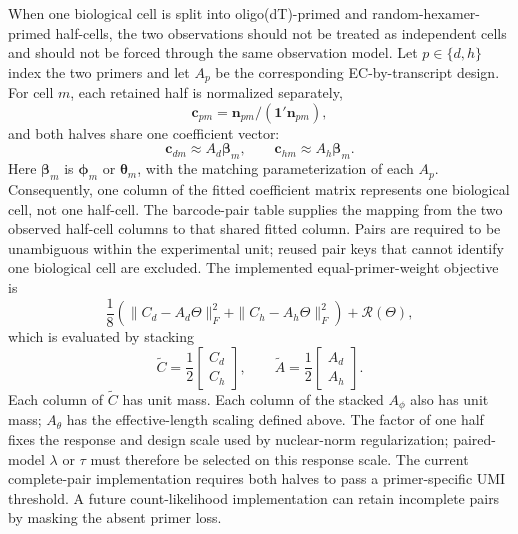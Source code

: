 \documentclass[11pt]{article}
\begin{document}
When one biological cell is split into oligo(dT)-primed and random-hexamer-
primed half-cells, the two observations should not be treated as independent
cells and should not be forced through the same observation model. Let
\(p\in\{d,h\}\) index the two primers and let \(A_p\) be the corresponding
EC-by-transcript design. For cell \(m\), each retained half is normalized
separately,
\[
  \bm c_{pm}=\bm n_{pm}/(\bm 1'\bm n_{pm}),
\]
and both halves share one coefficient vector:
\[
  \bm c_{dm}\approx A_d\bm\beta_m,
  \qquad
  \bm c_{hm}\approx A_h\bm\beta_m.
\]
Here \(\bm\beta_m\) is \(\bm\phi_m\) or \(\bm\theta_m\), with the matching
parameterization of each \(A_p\).
Consequently, one column of the fitted coefficient matrix represents one
biological cell, not one half-cell. The barcode-pair table supplies the mapping
from the two observed half-cell columns to that shared fitted column. Pairs are
required to be unambiguous within the experimental unit; reused pair keys that
cannot identify one biological cell are excluded.
The implemented equal-primer-weight objective is
\[
  \frac{1}{8}\left(
    \|C_d-A_d\Theta\|_F^2+
    \|C_h-A_h\Theta\|_F^2
  \right)+\mathcal R(\Theta),
\]
which is evaluated by stacking
\[
  \widetilde C=\frac{1}{2}\begin{bmatrix}C_d\\C_h\end{bmatrix},
  \qquad
  \widetilde A=\frac{1}{2}\begin{bmatrix}A_d\\A_h\end{bmatrix}.
\]
Each column of \(\widetilde C\) has unit mass. Each column of the stacked
\(A_\phi\) also has unit mass; \(A_\theta\) has the effective-length scaling
defined above. The factor of one half fixes the response and design scale used
by nuclear-norm regularization; paired-model
\(\lambda\) or \(\tau\) must therefore be selected on this response scale.
The current complete-pair implementation requires both halves to pass a
primer-specific UMI threshold. A future count-likelihood implementation can
retain incomplete pairs by masking the absent primer loss.
\end{document}
